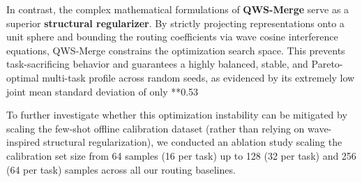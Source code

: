 \begin{enumerate}
    In contrast, the complex mathematical formulations of \textbf{QWS-Merge} serve as a superior \textbf{structural regularizer}. By strictly projecting representations onto a unit sphere and bounding the routing coefficients via wave cosine interference equations, QWS-Merge constrains the optimization search space. This prevents task-sacrificing behavior and guarantees a highly balanced, stable, and Pareto-optimal multi-task profile across random seeds, as evidenced by its extremely low joint mean standard deviation of only **0.53%

    To further investigate whether this optimization instability can be mitigated by scaling the few-shot offline calibration dataset (rather than relying on wave-inspired structural regularization), we conducted an ablation study scaling the calibration set size from 64 samples (16 per task) up to 128 (32 per task) and 256 (64 per task) samples across all our routing baselines. 


\end{enumerate}
